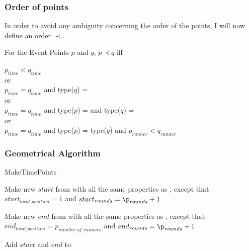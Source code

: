 \subsubsection{Order of points}
\label{order}
In order to avoid any ambiguity concerning the order of the points, I will now define an order $\prec$. 

\begin{defi}
For the Event Points $p$ and $q$, $p \prec q$ iff
\begin{center}
\label{orderOfPoints}
$p_{time} < q_{time}$\\
or \\
$p_{time} = q_{time}$ and type($q$) = \comFin\\
or \\
$p_{time} = q_{time}$ and type($p$) = \comStart and type($q$) = \comEnd \\
or \\
$p_{time} = q_{time}$ and type($p$) = type($q$) and $p_{runner} < q_{runner}$
\end{center}
\end{defi}


\subsubsection{Geometrical Algorithm}

\begin{algorithm}[H]
\caption{MakeTimePoints}
\highlights
{}
 
Make new \startT $start$ from \p with all the same properties as \p, except that $start_{local\_position} = 1$ and $start_{rounds} = \p_{rounds} + 1$
  
Make new \eT $end$ from \p with all the same properties as \p, except that $end_{local\_position} = p_{number\_of\_runners}$ and $end_{rounds} = \p_{rounds} + 1$
    
Add $start$ and $end$ to \li

\return \li
\end{algorithm}

